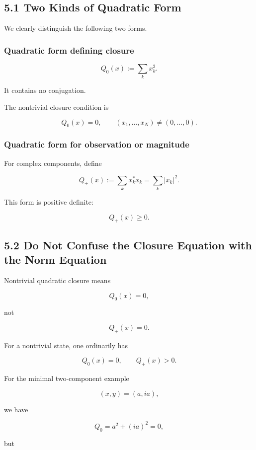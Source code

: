 \documentclass[
  a4paper,
  10pt]{article}
\begin{document}
\subsection{5.1 Two Kinds of Quadratic
Form}\label{51-two-kinds-of-quadratic-form}

We clearly distinguish the following two forms.

\subsubsection{Quadratic form defining
closure}\label{quadratic-form-defining-closure}

\[
Q_0(x):=\sum_kx_k^2.
\]

It contains no conjugation.

The nontrivial closure condition is

\[
Q_0(x)=0,
\qquad (x_1,\ldots,x_N)\neq(0,\ldots,0).
\]

\subsubsection{Quadratic form for observation or
magnitude}\label{quadratic-form-for-observation-or-magnitude}

For complex components, define

\[
Q_+(x):=\sum_kx_k^*x_k
=\sum_k|x_k|^2.
\]

This form is positive definite:

\[
Q_+(x)\ge0.
\]

\subsection{5.2 Do Not Confuse the Closure Equation with the Norm
Equation}\label{52-do-not-confuse-the-closure-equation-with-the-norm-equation}

Nontrivial quadratic closure means

\[
Q_0(x)=0,
\]

not

\[
Q_+(x)=0.
\]

For a nontrivial state, one ordinarily has

\[
Q_0(x)=0,
\qquad
Q_+(x)>0.
\]

For the minimal two-component example

\[
(x,y)=(a,ia),
\]

we have

\[
Q_0=a^2+(ia)^2=0,
\]

but
\end{document}
